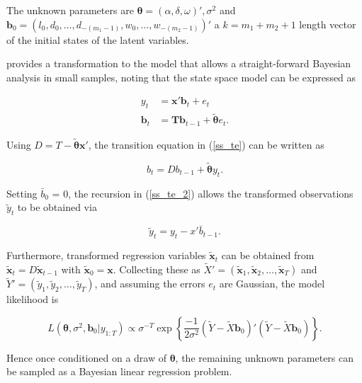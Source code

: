 \documentclass[12pt,a4paper]{article}%
\numberwithin{equation}{section}
\begin{document}
The unknown parameters are $\boldsymbol{\theta} = (\alpha, \delta, \omega)', \sigma^2$ and $\boldsymbol{b}_0 = (l_0, d_0, \dots, d_{-(m_1 - 1)}, w_0, \dots, w_{-(m_2 - 1)})'$ a $k = m_1 + m_2 + 1$ length vector of the initial states of the latent variables. 

\citet{Forbes2000} provides a transformation to the model that allows a straight-forward Bayesian analysis in small samples, noting that the state space model can be expressed as

\begin{align}
y_t &= \textbf{x}' \boldsymbol{b}_t + e_t \label{ss_me} \\
\textbf{b}_t &= \textbf{T} \textbf{b}_{t-1} + \tilde{\boldsymbol{\theta}} e_t \label{ss_te}.
\end{align}

Using $D = T - \tilde{\boldsymbol{\theta}} \textbf{x}'$, the transition equation in (\ref{ss_te}) can be written as 

\begin{equation}
b_t = D b_{t-1} + \tilde{\boldsymbol{\theta}} y_t \label{ss_te_2}.
\end{equation}

Setting $\bar{b}_0$ = 0, the recursion in (\ref{ss_te_2}) allows the transformed observations $\tilde{y}_t$ to be obtained via

\begin{equation}
\tilde{y}_t = y_t - x'\bar{b}_{t-1} \label{ss_rp_y}.
\end{equation}

Furthermore, transformed regression variables $\tilde{\textbf{x}}_t$ can be obtained from $\tilde{\textbf{x}}_t = D\tilde{\textbf{x}}_{t-1}$ with $\tilde{\textbf{x}}_0 = \textbf{x}$. Collecting these as $\widetilde{X}' = (\tilde{\textbf{x}}_1, \tilde{\textbf{x}}_2, \dots, \tilde{\textbf{x}}_T)$ and $\widetilde{Y}' = (\tilde{y}_1, \tilde{y}_2, \dots, \tilde{y}_T)$, and assuming the errors $e_t$ are Gaussian, the model likelihood is

\begin{equation}
L(\boldsymbol{\theta}, \sigma^2, \boldsymbol{b}_0 | y_{1:T}) \propto \sigma^{-T} \exp \left\{ \frac{-1}{2\sigma^2}(\widetilde{Y} - \widetilde{X}\boldsymbol{b}_0)'(\widetilde{Y} - \widetilde{X}\boldsymbol{b}_0) \right\}.
\end{equation}

Hence once conditioned on a draw of $\boldsymbol{\theta}$, the remaining unknown parameters can be sampled as a Bayesian linear regression problem.
\end{document}
